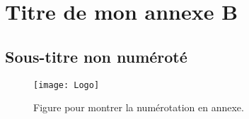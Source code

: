 \section{Titre de mon annexe B}
\label{annexe:B}

\subsection*{Sous-titre non numéroté}

%
\begin{figure}[!h]
\centering
	\texttt{[image: Logo]}
\caption[Titre court]{Figure pour montrer la numérotation en annexe.}
\end{figure}
%